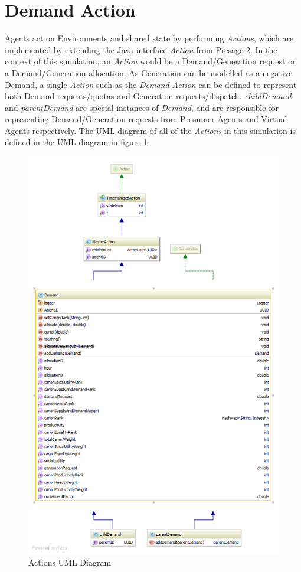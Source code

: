 \clearpage

\section*{Demand Action}
Agents act on Environments and shared state by performing \textit{Actions}, which are implemented by extending the Java interface \textit{Action} from Presage 2. In the context of this simulation, an \textit{Action} would be a Demand/Generation request or a Demand/Generation allocation. As Generation can be modelled as a negative Demand, a single \textit{Action} such as the \textit{Demand Action} can be defined to represent both Demand requests/quotas and Generation requests/dispatch. \textit{childDemand} and \textit{parentDemand} are special instances of \textit{Demand}, and are responsible for representing Demand/Generation requests from Prosumer Agents and Virtual Agents respectively. The UML diagram of all of the \textit{Actions} in this simulation is defined in the UML diagram in figure \ref{fig:ActionUML}.

\begin{figure}[!h]
	\centering
	\includegraphics[scale=0.5]{Images/ActionUML.png}
	\caption{Actions UML Diagram}
	\label{fig:ActionUML}
\end{figure}

